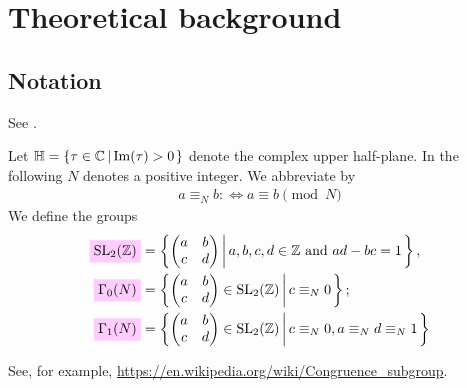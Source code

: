 \documentclass{article}
\begin{document}
%

\section{Theoretical background}

\subsection{Notation}
\begin{Hemmecke}
  See \cite{HemmeckePauleRadu_IntegralBasis_2021}.
\end{Hemmecke}

Let $\setH=\SetDef{\tau\in \setC}{\mathrm{Im}(\tau)>0}$ denote the
complex upper half-plane.
%
In the following $N$ denotes a positive integer. We abbreviate
 by
\begin{gather}
  a \equiv_N b :\iff a \equiv b \pmod{N}
\end{gather}
%
We define the groups
\begin{align}
  \defineNotation[SL2Z]{\SL2Z}
  &=
  \SetDef{
    \begin{pmatrix}
      a & b\\
      c & d\\
    \end{pmatrix}}{a,b,c,d\in\setZ \text{ and } ad-bc=1},
  \label{eq:SL2Z}
  \\
  \defineNotation[Gamma0N]{\Gamma_0(N)}
  &=
  \SetDef{
    \begin{pmatrix}
      a & b\\
      c & d\\
    \end{pmatrix} \in \SL2Z}{c \equiv_N 0};
  \label{eq:Gamma0}
  \\
  \defineNotation[Gamma1N]{\Gamma_1(N)}
  &=
  \SetDef{
    \begin{pmatrix}
      a & b\\
      c & d
    \end{pmatrix} \in \SL2Z}{c \equiv_N 0, a \equiv_N d \equiv_N 1}
  \label{eq:Gamma1}
\end{align}

\begin{AdditionalInformation}
See, for example,
\url{https://en.wikipedia.org/wiki/Congruence_subgroup}.
\end{AdditionalInformation}
\end{document}

